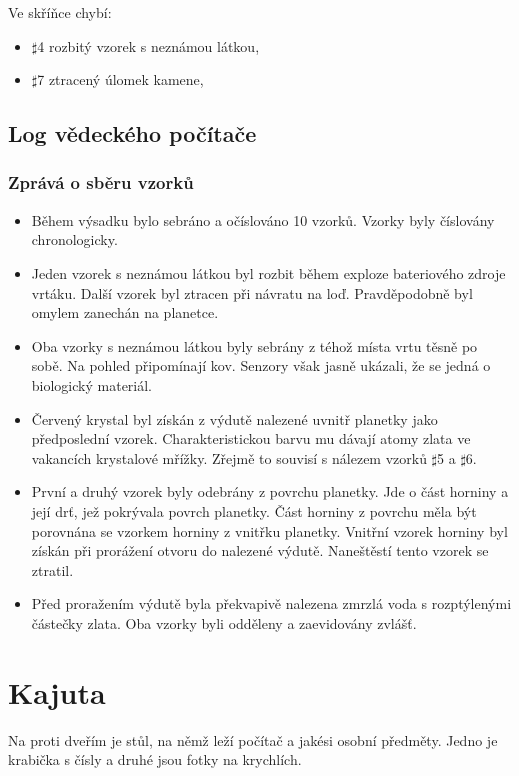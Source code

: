 \documentclass[11pt,oneside,a4paper]{article}
\begin{document}
\noindent Ve skříňce chybí:
\begin{itemize}
\item $\sharp$4 rozbitý vzorek s neznámou látkou,
\item $\sharp$7 ztracený úlomek kamene,
\end{itemize}

\subsection{\texorpdfstring{Log vědeckého počítače}{Log vedeckeho pocitace}}
\label{subsec:log_vedeckeho_pocitace}
\subsubsection{\texorpdfstring{Zprává o sběru vzorků}{Zprava o sberu vzorku}}
\label{subsubsec:zprava_o_sberu_vzorku}
\begin{itemize}
\item Během výsadku bylo sebráno a očíslováno 10 vzorků. Vzorky byly číslovány chronologicky.
\item Jeden vzorek s neznámou látkou byl rozbit během exploze bateriového zdroje vrtáku. Další vzorek byl ztracen při návratu na loď. Pravděpodobně byl omylem zanechán na planetce.
\item Oba vzorky s neznámou látkou byly sebrány z téhož místa vrtu těsně po sobě. Na pohled připomínají kov. Senzory však jasně ukázali, že se jedná o biologický materiál.
\item Červený krystal byl získán z výdutě nalezené uvnitř planetky jako předposlední vzorek. Charakteristickou barvu mu dávají atomy zlata ve vakancích krystalové mřížky. Zřejmě to souvisí s nálezem vzorků $\sharp$5 a $\sharp$6.
\item První a druhý vzorek byly odebrány z povrchu planetky. Jde o část horniny a její drť, jež pokrývala povrch planetky. Část horniny z povrchu měla být porovnána se vzorkem horniny z vnitřku planetky. Vnitřní vzorek horniny byl získán při prorážení otvoru do nalezené výdutě. Naneštěstí tento vzorek se ztratil.
\item Před proražením výdutě byla překvapivě nalezena zmrzlá voda s rozptýlenými částečky zlata. Oba vzorky byli odděleny a zaevidovány zvlášť. 
\end{itemize}

\section{\texorpdfstring{Kajuta}{Kajuta}}
\label{sec:kajuta}
Na proti dveřím je stůl, na němž leží počítač a jakési osobní předměty. Jedno je krabička s čísly a druhé jsou fotky na krychlích.
\end{document}
